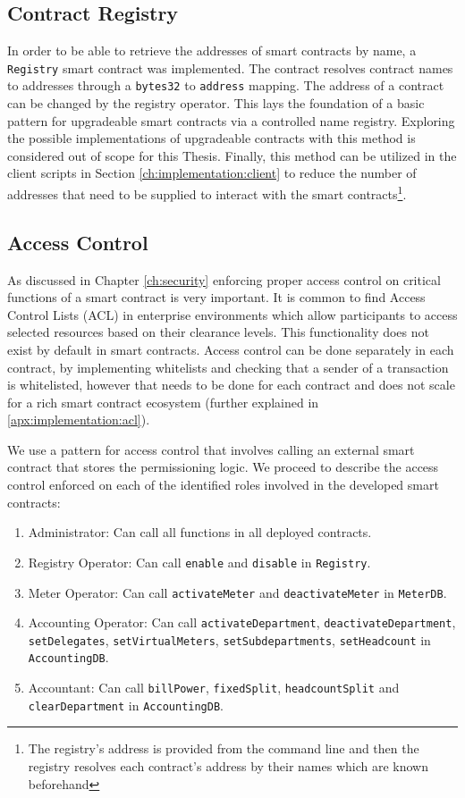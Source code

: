 \subsection{Contract Registry} 

In order to be able to retrieve the addresses of smart contracts by name, a \texttt{Registry} smart contract was implemented. The contract resolves contract names to addresses through a \texttt{bytes32} to \texttt{address} mapping. The address of a contract can be changed by the registry operator. This lays the foundation of a basic pattern for upgradeable smart contracts via a controlled name registry. Exploring the possible implementations of upgradeable contracts with this method is considered out of scope for this Thesis. Finally, this method can be utilized in the client scripts in Section \ref{ch:implementation:client} to reduce the number of addresses that need to be supplied to interact with the smart contracts\footnote{The registry's address is provided from the command line and then the registry resolves each contract's address by their names which are known beforehand}.

\subsection{Access Control} \label{acl}
As discussed in Chapter \ref{ch:security} enforcing proper access control on critical functions of a smart contract is very important. It is common to find Access Control Lists (ACL) in enterprise environments which allow participants to access selected resources based on their clearance levels. This functionality does not exist by default in smart contracts. Access control can be done separately in each contract, by implementing whitelists and checking that a sender of a transaction is whitelisted, however that needs to be done for each contract and does not scale for a rich smart contract ecosystem (further explained in \ref{apx:implementation:acl}). 

We use a pattern for access control that involves calling an external smart contract that stores the permissioning logic. We proceed to describe the access control enforced on each of the identified roles involved in the developed smart contracts:
\begin{enumerate}
    \item Administrator: Can call all functions in all deployed contracts.
    \item Registry Operator: Can call \texttt{enable} and \texttt{disable} in \texttt{Registry}.
    \item Meter Operator: Can call \texttt{activateMeter} and \texttt{deactivateMeter} in \texttt{MeterDB}.
    \item Accounting Operator: Can call \texttt{activateDepartment}, \texttt{deactivateDepartment}, \texttt{setDelegates}, \texttt{setVirtualMeters}, \texttt{setSubdepartments}, \texttt{setHeadcount} in \texttt{AccountingDB}.
    \item Accountant: Can call \texttt{billPower}, \texttt{fixedSplit}, \texttt{headcountSplit} and \texttt{clearDepartment} in \texttt{AccountingDB}.
\end{enumerate}



